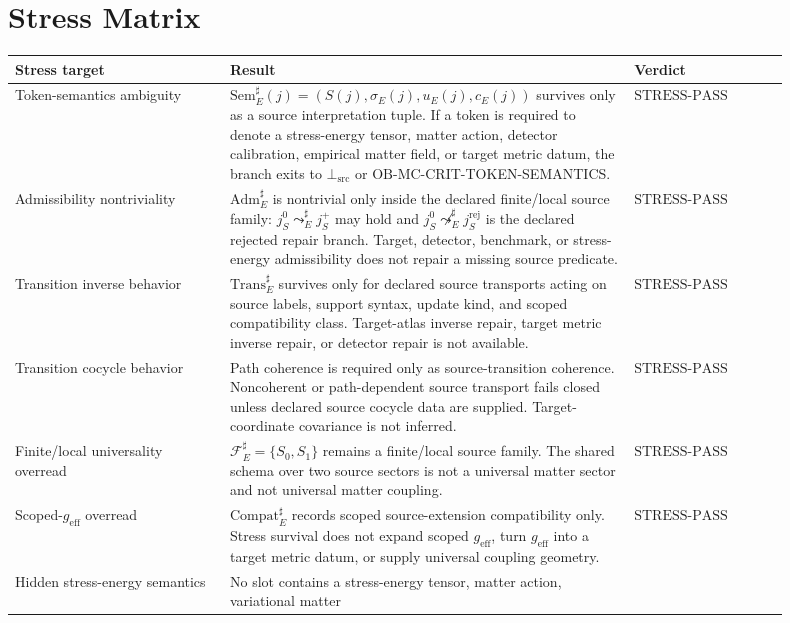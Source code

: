 \documentclass[11pt]{article}
\newcommand{\geff}{g_{\mathrm{eff}}}
\newcommand{\BottomSrc}{\bot_{\mathrm{src}}}
\newcommand{\Sem}{\mathrm{Sem}}
\newcommand{\Adm}{\mathrm{Adm}}
\newcommand{\Trans}{\mathrm{Trans}}
\newcommand{\Compat}{\mathrm{Compat}}
\newcommand{\OBMC}{\mathrm{OB}\mbox{-}\mathrm{MC}}
\newcommand{\Fsrc}{\mathcal{F}_{E}^{\sharp}}
\newcommand{\StressPass}{\mathrm{STRESS}\mbox{-}\mathrm{PASS}}
\begin{document}
\section{Stress Matrix}

\begin{longtable}{p{0.25\linewidth}p{0.47\linewidth}p{0.18\linewidth}}
\toprule
Stress target & Result & Verdict \\
\midrule
Token-semantics ambiguity &
\(\Sem_E^{\sharp}(j)=(S(j),\sigma_E(j),u_E(j),c_E(j))\) survives only as a
source interpretation tuple. If a token is required to denote a stress-energy
tensor, matter action, detector calibration, empirical matter field, or target
metric datum, the branch exits to \(\BottomSrc\) or
\(\OBMC\)-CRIT-TOKEN-SEMANTICS. & \(\StressPass\) \\
\addlinespace
Admissibility nontriviality &
\(\Adm_E^{\sharp}\) is nontrivial only inside the declared finite/local source
family: \(j_S^0\leadsto_E^{\sharp}j_S^+\) may hold and
\(j_S^0\not\leadsto_E^{\sharp}j_S^{\mathrm{rej}}\) is the declared rejected
repair branch. Target, detector, benchmark, or stress-energy admissibility
does not repair a missing source predicate. & \(\StressPass\) \\
\addlinespace
Transition inverse behavior &
\(\Trans_E^{\sharp}\) survives only for declared source transports acting on
source labels, support syntax, update kind, and scoped compatibility class.
Target-atlas inverse repair, target metric inverse repair, or detector repair
is not available. & \(\StressPass\) \\
\addlinespace
Transition cocycle behavior &
Path coherence is required only as source-transition coherence. Noncoherent
or path-dependent source transport fails closed unless declared source cocycle
data are supplied. Target-coordinate covariance is not inferred. &
\(\StressPass\) \\
\addlinespace
Finite/local universality overread &
\(\Fsrc=\{S_0,S_1\}\) remains a finite/local source family. The shared schema
over two source sectors is not a universal matter sector and not universal
matter coupling. & \(\StressPass\) \\
\addlinespace
Scoped-\(\geff\) overread &
\(\Compat_E^{\sharp}\) records scoped source-extension compatibility only.
Stress survival does not expand scoped \(\geff\), turn \(\geff\) into a target
metric datum, or supply universal coupling geometry. & \(\StressPass\) \\
\addlinespace
Hidden stress-energy semantics &
No slot contains a stress-energy tensor, matter action, variational matter

\end{longtable}
\end{document}
